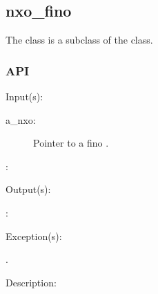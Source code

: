 %
%
%
%
%              

\subsection{nxo\_fino}
\label{nxo_fino}

The  class is a subclass of the  class.

\subsubsection{API}
\begin{capi}
\label{nxo_fino_}
	\begin{capilist}
	\item[Input(s): ]
		\begin{description}\item[]
		\item[a\_nxo: ]
			Pointer to a fino .
		\item[: ]
		\end{description}
	\item[Output(s): ]
		\begin{description}\item[]
		\item[: ]
		\end{description}
	\item[Exception(s): ]
		\begin{description}\item[]
		\item[.]
		\end{description}
	\item[Description: ]
	\end{capilist}
\end{capi}
